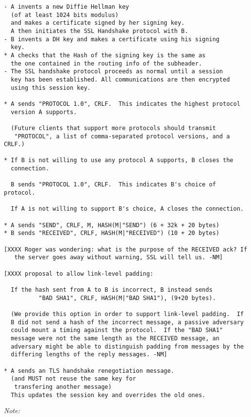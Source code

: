 \begin{verbatim}
- A invents a new Diffie Hellman key 
  (of at least 1024 bits modulus)
  and makes a certificate signed by her signing key.
  A then initiates the SSL Handshake protocol with B.
- B invents a DH key and makes a certificate using his signing
  key.
* A checks that the Hash of the signing key is the same as
  the one contained in the routing info of the subheader.
- The SSL handshake protocol proceeds as normal until a session
  key has been established. All communications are then encrypted
  using this session key.

* A sends "PROTOCOL 1.0", CRLF.  This indicates the highest protocol
  version A supports.

  (Future clients that support more protocols should transmit
   "PROTOCOL", a list of comma-separated protocol versions, and a CRLF.)

* If B is not willing to use any protocol A supports, B closes the 
  connection.

  B sends "PROTOCOL 1.0", CRLF.  This indicates B's choice of protocol.

  If A is not willing to support B's choice, A closes the connection.

* A sends "SEND", CRLF, M, HASH(M|"SEND") (6 + 32k + 20 bytes)
* B sends "RECEIVED", CRLF, HASH(M|"RECEIVED") (10 + 20 bytes)

[XXXX Roger was wondering: what is the purpose of the RECEIVED ack? If
   the server goes away without warning, SSL will tell us. -NM]

[XXXX proposal to allow link-level padding:

  If the hash sent from A to B is incorrect, B instead sends
          "BAD SHA1", CRLF, HASH(M|"BAD SHA1"), (9+20 bytes).

  (We provide this option in order to support link-level padding.  If
  B did not send a hash of the incorrect message, a passive adversary
  could mount a timing against the protocol.  If the "BAD SHA1"
  message were not the same length as the RECEIVED message, an
  adversary might be able to distinguish padding from messages by the
  differing lengths of the reply messages. -NM]

* A sends an TLS handshake renegotiation message.
  (and MUST not reuse the same key for 
   transfering another message)
  This updates the session key and overrides the old ones.
\end{verbatim}

\emph{Note:}

